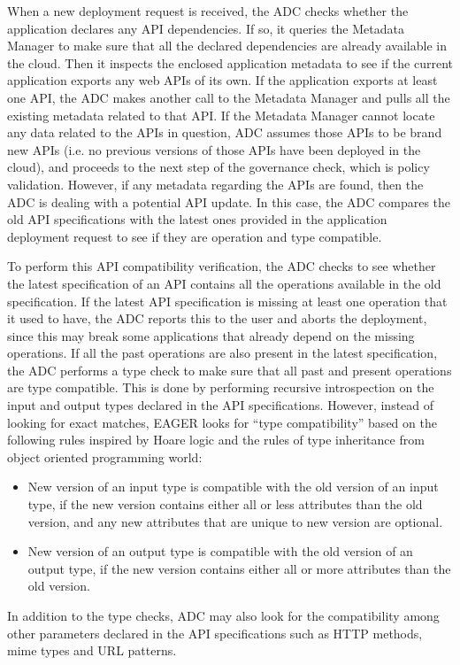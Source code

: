 When a new deployment request is received, the ADC checks whether the application declares any API dependencies. If so, it
queries the Metadata Manager to make sure that all the declared dependencies are already available in the cloud. 
Then it inspects the enclosed application metadata to see if the current application exports any web
APIs of its own. If the application exports at least one API, the ADC makes another call to the Metadata Manager and pulls all the existing 
metadata related to that API. If
the Metadata Manager cannot locate any data related to the APIs in question, ADC assumes those APIs to be brand new
APIs (i.e. no previous versions of those APIs have been deployed in the cloud), and proceeds to the next step of the governance check, which is policy
validation. However, if any metadata regarding the APIs are found, then the ADC is dealing with a potential API update. In this
case, the ADC compares the old API specifications with the latest ones provided in the application deployment request to see if
they are operation and type compatible.

To perform this API compatibility verification, the ADC checks to see whether the latest specification of an API contains all 
the operations available in the old specification. If the latest API specification is missing at least one operation that it used to have, the ADC
reports this to the user and aborts the deployment, since this may break some applications that already depend on the missing operations. 
If all the past operations are also present in the latest specification, the ADC performs a type check to make sure that 
all past and present operations are type compatible. This is done by performing recursive introspection on the input and output types declared in the
API specifications. However, instead of looking for exact matches, EAGER looks for ``type compatibility'' based on the following rules inspired by Hoare
logic and the rules of type inheritance from object oriented programming world:
\begin{itemize}
\item New version of an input type is compatible with the old version of an input type, if the new version contains either all or less attributes than the 
old version, and any new attributes that are unique to new version are optional.
\item New version of an output type is compatible with the old version of an output type, if the new version contains either all or more attributes than the 
old version.
\end{itemize}
In addition to the type checks, ADC may also look for the compatibility among other parameters declared in the API specifications
such as HTTP methods, mime types and URL patterns.

